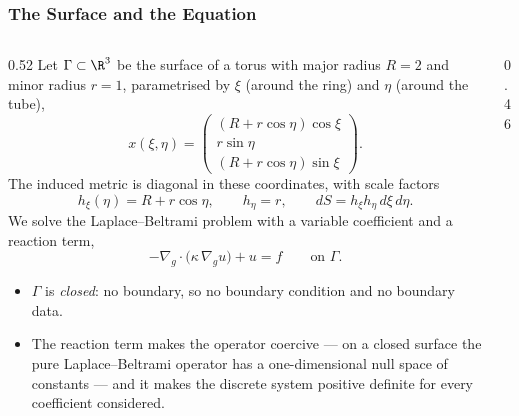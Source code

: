 \frametitle{The Surface and the Equation}
\footnotesize

\begin{columns}[T]
\begin{column}{0.52\textwidth}
Let $\Gamma \subset \R^3$ be the surface of a torus with major radius $R = 2$ and minor
radius $r = 1$, parametrised by $\xi$ (around the ring) and $\eta$ (around the tube),
\[
x(\xi,\eta)=\begin{pmatrix}(R+r\cos\eta)\cos\xi\\ r\sin\eta\\ (R+r\cos\eta)\sin\xi\end{pmatrix}.
\]
The induced metric is diagonal in these coordinates, with scale factors
\[
h_\xi(\eta)=R+r\cos\eta,\qquad h_\eta=r,\qquad dS=h_\xi h_\eta\,d\xi\,d\eta .
\]
We solve the Laplace--Beltrami problem with a variable coefficient and a reaction term,
\[
-\nabla_g\cdot\bigl(\kappa\,\nabla_g u\bigr)+u=f \qquad\text{on } \Gamma .
\]
\begin{itemize}
\item $\Gamma$ is \emph{closed}: no boundary, so no boundary condition and no boundary
data.
\item The reaction term makes the operator coercive --- on a closed surface the pure
Laplace--Beltrami operator has a one-dimensional null space of constants --- and it makes
the discrete system positive definite for every coefficient considered.
\end{itemize}
\end{column}
\begin{column}{0.46\textwidth}
\centering
{}


\end{column}
\end{columns}

